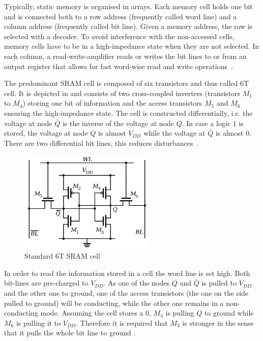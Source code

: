 \documentclass[conference]{IEEEtran}
\begin{document}
Typically, static memory is organised in arrays. Each memory cell holds one bit and is connected both to a row address (frequently called word line) and a column address (frequently called bit line). Given a memory address, the row is selected with a decoder. To avoid interference with the non-accessed cells, memory cells have to be in a high-impedance state when they are not selected. In each column, a read-write-amplifier reads or writes the bit lines to or from an output register that allows for fast word-wise read and write operations~\cite{Tietze2019}.

The predominant SRAM cell is composed of six transistors and thus called 6T cell. It is depicted in  and consists of two cross-coupled inverters (transistors $M_1$ to $M_4$) storing one bit of information and the access transistors $M_5$ and $M_6$ ensuring the high-impedance state. The cell is constructed differentially, i.e. the voltage at node $\bar Q$ is the inverse of the voltage at node $Q$. In case a logic $1$ is stored, the voltage at node $Q$ is almost $V_{DD}$ while the voltage at $\bar Q$ is almost $0$. There are two differential bit lines, this reduces disturbances~\cite{Tietze2019}.

\begin{figure}
	\centering
	\includegraphics[width=6.5cm]{6t_cell.png}
	\caption{Standard 6T SRAM cell \cite{6t}}
	\label{fig:6t}
\end{figure}

In order to read the information stored in a cell the word line is set high. Both bit-lines are pre-charged to $V_{DD}$. As one of the nodes $Q$ and $\bar Q$ is pulled to $V_{DD}$ and the other one to ground, one of the access transistors (the one on the side pulled to ground) will be conducting, while the other one remains in a non-conducting mode. Assuming the cell stores a $0$, $M_3$ is pulling $Q$ to ground while $M_6$ is pulling it to $V_{DD}$. Therefore it is required that $M_3$ is stronger in the sense that it pulls the whole bit line to ground \cite{Senousy2016}.
\end{document}
